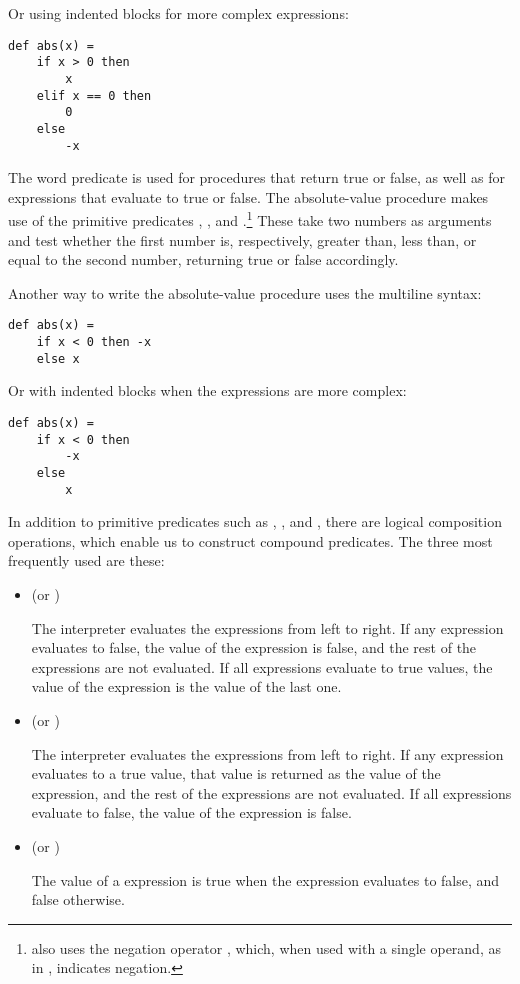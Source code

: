 Or using indented blocks for more complex expressions:

\begin{lstlisting}
def abs(x) =
    if x > 0 then 
        x
    elif x == 0 then 
        0
    else 
        -x
\end{lstlisting}

The word predicate is used for procedures that return true or false, as well as for expressions that evaluate to true or false. The absolute-value procedure  makes use of the primitive predicates \slate{>}, \slate{<}, and \slate{==}.\footnote{ also uses the negation operator \slate{-}, which, when used with a single operand, as in , indicates negation.} These take two numbers as arguments and test whether the first number is, respectively, greater than, less than, or equal to the second number, returning true or false accordingly.

Another way to write the absolute-value procedure uses the multiline syntax:

\begin{lstlisting}
def abs(x) =
    if x < 0 then -x
    else x
\end{lstlisting}

Or with indented blocks when the expressions are more complex:

\begin{lstlisting}
def abs(x) =
    if x < 0 then
        -x
    else
        x
\end{lstlisting}

In addition to primitive predicates such as \slate{<}, \slate{==}, and \slate{>}, there are logical composition operations, which enable us to construct compound predicates. The three most frequently used are these:

\begin{itemize}
\item \textbf{} (or \slate{&&})

The interpreter evaluates the expressions from left to right. If any expression evaluates to false, the value of the  expression is false, and the rest of the expressions are not evaluated. If all expressions evaluate to true values, the value of the  expression is the value of the last one.

\item \textbf{} (or \slate{||})

The interpreter evaluates the expressions from left to right. If any expression evaluates to a true value, that value is returned as the value of the  expression, and the rest of the expressions are not evaluated. If all expressions evaluate to false, the value of the  expression is false.

\item \textbf{} (or \slate{!})

The value of a  expression is true when the expression evaluates to false, and false otherwise.
\end{itemize}


